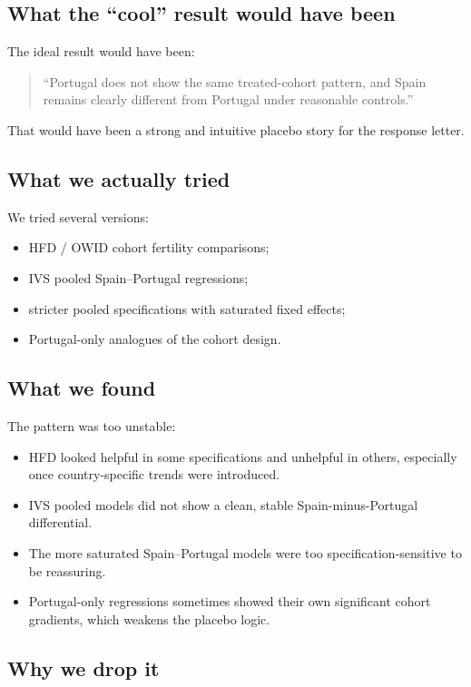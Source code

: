 \documentclass[11pt]{article}
\begin{document}
\subsection*{What the ``cool'' result would have been}

The ideal result would have been:

\begin{quote}
``Portugal does not show the same treated-cohort pattern, and Spain remains clearly different from Portugal under reasonable controls.''
\end{quote}

That would have been a strong and intuitive placebo story for the response letter.

\subsection*{What we actually tried}

We tried several versions:
\begin{itemize}[leftmargin=*]
\item HFD / OWID cohort fertility comparisons;
\item IVS pooled Spain--Portugal regressions;
\item stricter pooled specifications with saturated fixed effects;
\item Portugal-only analogues of the cohort design.
\end{itemize}

\subsection*{What we found}

The pattern was too unstable:
\begin{itemize}[leftmargin=*]
\item HFD looked helpful in some specifications and unhelpful in others, especially once country-specific trends were introduced.
\item IVS pooled models did not show a clean, stable Spain-minus-Portugal differential.
\item The more saturated Spain--Portugal models were too specification-sensitive to be reassuring.
\item Portugal-only regressions sometimes showed their own significant cohort gradients, which weakens the placebo logic.
\end{itemize}

\subsection*{Why we drop it}
\end{document}
